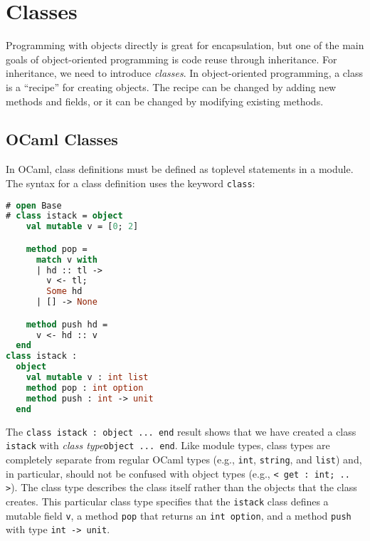 \hypertarget{classes}{%
\section{Classes}\label{classes}}

Programming with objects directly is great for encapsulation, but one of
the main goals of object-oriented programming is code reuse through
inheritance. For inheritance, we need to introduce \emph{classes}. In
object-oriented programming, a class is a ``recipe'' for creating
objects. The recipe can be changed by adding new methods and fields, or
it can be changed by modifying existing methods.

\hypertarget{ocaml-classes}{%
\subsection{OCaml Classes}\label{ocaml-classes}}

In OCaml, class definitions must be defined as toplevel statements in a
module. The syntax for a class definition uses the keyword
\passthrough{\lstinline!class!}: 

\begin{lstlisting}[language=Caml]
# open Base
# class istack = object
    val mutable v = [0; 2]

    method pop =
      match v with
      | hd :: tl ->
        v <- tl;
        Some hd
      | [] -> None

    method push hd =
      v <- hd :: v
  end
class istack :
  object
    val mutable v : int list
    method pop : int option
    method push : int -> unit
  end
\end{lstlisting}

The \passthrough{\lstinline!class istack : object ... end!} result shows
that we have created a class \passthrough{\lstinline!istack!} with
\emph{class type}\passthrough{\lstinline!object ... end!}. Like module
types, class types are completely separate from regular OCaml types
(e.g., \passthrough{\lstinline!int!}, \passthrough{\lstinline!string!},
and \passthrough{\lstinline!list!}) and, in particular, should not be
confused with object types (e.g.,
\passthrough{\lstinline!< get : int; .. >!}). The class type describes
the class itself rather than the objects that the class creates. This
particular class type specifies that the
\passthrough{\lstinline!istack!} class defines a mutable field
\passthrough{\lstinline!v!}, a method \passthrough{\lstinline!pop!} that
returns an \passthrough{\lstinline!int option!}, and a method
\passthrough{\lstinline!push!} with type
\passthrough{\lstinline!int -> unit!}.

